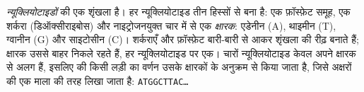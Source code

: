 \begin{definition}[न्यूक्लियोटाइड]\label{def:g10:universal-dna:nucleotide}
 \emph{न्यूक्लियोटाइडों} की एक शृंखला है। हर
न्यूक्लियोटाइड तीन हिस्सों से बना है: एक फ़ॉस्फ़ेट समूह, एक शर्करा
(डिऑक्सीराइबोस) और नाइट्रोजनयुक्त चार में से एक
\emph{क्षारक}: एडेनीन (A), थाइमीन (T), ग्वानीन (G)
और साइटोसीन (C)। शर्कराएँ और फ़ॉस्फ़ेट बारी-बारी से आकर शृंखला की रीढ़
बनाते हैं; क्षारक उससे बाहर निकले रहते हैं, हर न्यूक्लियोटाइड पर एक।
चारों न्यूक्लियोटाइड केवल अपने क्षारक से अलग हैं, इसलिए  की किसी लड़ी
का वर्णन उसके क्षारकों के अनुक्रम से किया जाता है, जिसे अक्षरों की एक
माला की तरह लिखा जाता है: \texttt{ATGGCTTAC\dots}
\end{definition}

